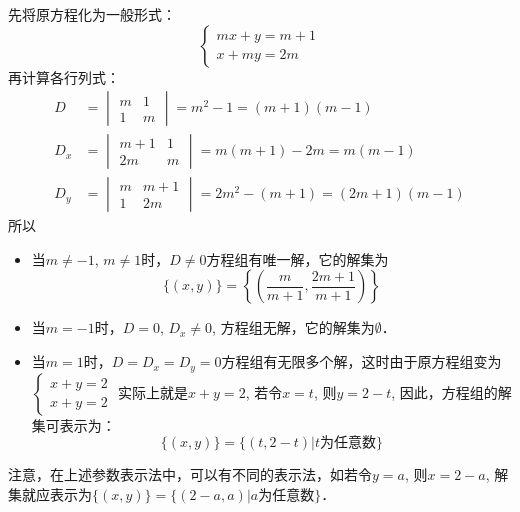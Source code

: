    
   
   \begin{solution}
先将原方程化为一般形式：
\[\begin{cases}
    mx+y=m+1\\
    x+my=2m   
\end{cases}\]
再计算各行列式：
\[\begin{split}
D&=\begin{vmatrix}
    m&1\\1&m
\end{vmatrix}=m^2-1=(m+1)(m-1)\\
D_x&=\begin{vmatrix}
    m+1&1\\2m&m
\end{vmatrix}=m(m+1)-2m=m(m-1)\\
D_y&=\begin{vmatrix}
    m&m+1\\1&2m
\end{vmatrix}=2m^2-(m+1)=(2m+1)(m-1)
\end{split}\]
所以
\begin{itemize}
    \item 当$m\ne -1$, $m\ne 1$时，$D\ne 0$方程组有唯一解，它的解集为
\[\{ (x,y) \} = \left\{ \left(\frac{m}{m+1},\frac{2m+1}{m+1}\right) \right\}\]
\item 当$m=-1$时，$D=0$, $D_x\ne 0$, 方程组无解，它的解集为$\emptyset$．
\item 当$m=1$时，$D=D_x=D_y=0$方程组有无限多个解，这时由于原方程组变为
$\begin{cases}
    x+y=2\\x+y=2
\end{cases}$
实际上就是$x+y=2$, 若令$x=t$, 则$y=2-t$, 因此，方程组的解集可表示为：
\[\{(x,y)\}=\{(t,2-t)|\text{$t$为任意数}\}\]
\end{itemize}

注意，在上述参数表示法中，可以有不同的表示法，如若令$y=a$, 则$x=2-a$, 解集就应表示为$\{(x,y)\}=\{(2-a,a)|\text{$a$为任意数}\}$．
\end{solution}

